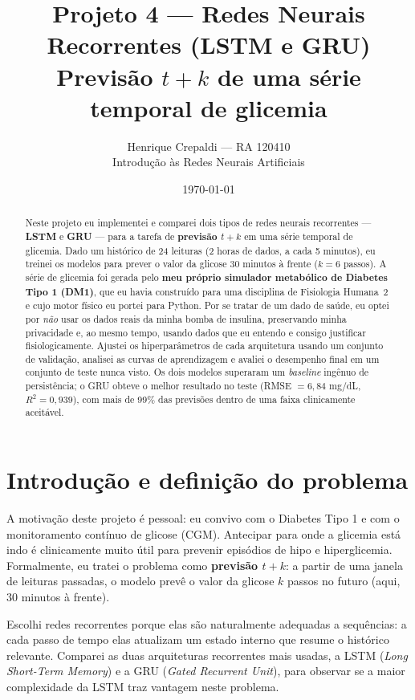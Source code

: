 \documentclass[11pt,a4paper]{article}
\title{\textbf{Projeto 4 --- Redes Neurais Recorrentes (LSTM e GRU)}\\[4pt]
\large Previsão $t+k$ de uma série temporal de glicemia}
\author{Henrique Crepaldi --- RA 120410\\
Introdução às Redes Neurais Artificiais}
\date{\today}
\begin{document}
\maketitle

\begin{abstract}
Neste projeto eu implementei e comparei dois tipos de redes neurais
recorrentes --- \textbf{LSTM} e \textbf{GRU} --- para a tarefa de
\textbf{previsão $t+k$} em uma série temporal de glicemia. Dado um histórico de
24 leituras (2 horas de dados, a cada 5 minutos), eu treinei os modelos para
prever o valor da glicose 30 minutos à frente ($k=6$ passos). A série de
glicemia foi gerada pelo \textbf{meu próprio simulador metabólico de Diabetes
Tipo 1 (DM1)}, que eu havia construído para uma disciplina de Fisiologia
Humana~2 e cujo motor físico eu portei para Python. Por se tratar de um dado de
saúde, eu optei por \emph{não} usar os dados reais da minha bomba de insulina,
preservando minha privacidade e, ao mesmo tempo, usando dados que eu entendo e
consigo justificar fisiologicamente. Ajustei os hiperparâmetros de cada
arquitetura usando um conjunto de validação, analisei as curvas de aprendizagem
e avaliei o desempenho final em um conjunto de teste nunca visto. Os dois
modelos superaram um \emph{baseline} ingênuo de persistência; o GRU obteve o
melhor resultado no teste (RMSE $= 6{,}84$ mg/dL, $R^2 = 0{,}939$), com mais de
99\% das previsões dentro de uma faixa clinicamente aceitável.
\end{abstract}

\section{Introdução e definição do problema}

A motivação deste projeto é pessoal: eu convivo com o Diabetes Tipo 1 e com o
monitoramento contínuo de glicose (CGM). Antecipar para onde a glicemia está
indo é clinicamente muito útil para prevenir episódios de hipo e
hiperglicemia. Formalmente, eu tratei o problema como \textbf{previsão $t+k$}:
a partir de uma janela de leituras passadas, o modelo prevê o valor da glicose
$k$ passos no futuro (aqui, 30 minutos à frente).

Escolhi redes recorrentes porque elas são naturalmente adequadas a sequências:
a cada passo de tempo elas atualizam um estado interno que resume o histórico
relevante. Comparei as duas arquiteturas recorrentes mais usadas, a LSTM
(\emph{Long Short-Term Memory}) e a GRU (\emph{Gated Recurrent Unit}), para
observar se a maior complexidade da LSTM traz vantagem neste problema.
\end{document}
